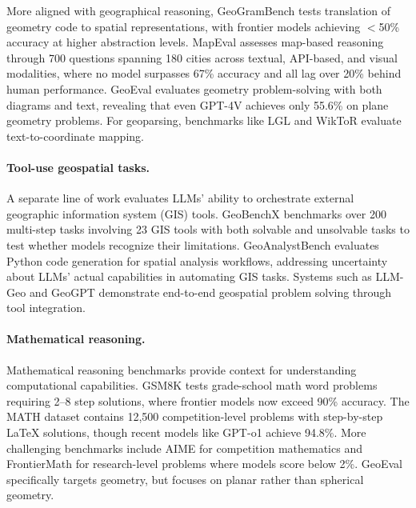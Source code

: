 More aligned with geographical reasoning, GeoGramBench \citep{luo2025geogrambench} tests translation of geometry code to spatial representations, with frontier models achieving $<$50\% accuracy at higher abstraction levels. MapEval \citep{dihan2025mapeval} assesses map-based reasoning through 700 questions spanning 180 cities across textual, API-based, and visual modalities, where no model surpasses 67\% accuracy and all lag over 20\% behind human performance. GeoEval \citep{zhang2024geoeval} evaluates geometry problem-solving with both diagrams and text, revealing that even GPT-4V achieves only 55.6\% on plane geometry problems. For geoparsing, benchmarks like LGL \citep{lieberman2010geotagging} and WikToR \citep{gritta2018wikor} evaluate text-to-coordinate mapping.

\paragraph{Tool-use geospatial tasks.}
A separate line of work evaluates LLMs' ability to orchestrate external geographic information system (GIS) tools. GeoBenchX \citep{krechetova2025geobenchx} benchmarks over 200 multi-step tasks involving 23 GIS tools with both solvable and unsolvable tasks to test whether models recognize their limitations. GeoAnalystBench \citep{zhang2025geoanalystbench} evaluates Python code generation for spatial analysis workflows, addressing uncertainty about LLMs' actual capabilities in automating GIS tasks. Systems such as LLM-Geo \citep{li2023llmgeo} and GeoGPT \citep{zhang2024geogpt} demonstrate end-to-end geospatial problem solving through tool integration.

\paragraph{Mathematical reasoning.}
Mathematical reasoning benchmarks provide context for understanding computational capabilities. GSM8K \citep{cobbe2021gsm8k} tests grade-school math word problems requiring 2--8 step solutions, where frontier models now exceed 90\% accuracy. The MATH dataset \citep{hendrycks2021math} contains 12,500 competition-level problems with step-by-step LaTeX solutions, though recent models like GPT-o1 achieve 94.8\%. More challenging benchmarks include AIME \citep{aime2024} for competition mathematics and FrontierMath \citep{glazer2024frontiermath} for research-level problems where models score below 2\%. GeoEval \citep{zhang2024geoeval} specifically targets geometry, but focuses on planar rather than spherical geometry.

